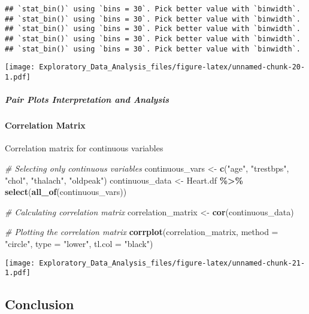 \documentclass[
]{article}
\newenvironment{Shaded}{\begin{snugshade}}{\end{snugshade}}
\newcommand{\AttributeTok}[1]{\textcolor[rgb]{0.13,0.29,0.53}{#1}}
\newcommand{\CommentTok}[1]{\textcolor[rgb]{0.56,0.35,0.01}{\textit{#1}}}
\newcommand{\FunctionTok}[1]{\textcolor[rgb]{0.13,0.29,0.53}{\textbf{#1}}}
\newcommand{\NormalTok}[1]{#1}
\newcommand{\OtherTok}[1]{\textcolor[rgb]{0.56,0.35,0.01}{#1}}
\newcommand{\SpecialCharTok}[1]{\textcolor[rgb]{0.81,0.36,0.00}{\textbf{#1}}}
\newcommand{\StringTok}[1]{\textcolor[rgb]{0.31,0.60,0.02}{#1}}
\begin{document}
\begin{verbatim}
## `stat_bin()` using `bins = 30`. Pick better value with `binwidth`.
## `stat_bin()` using `bins = 30`. Pick better value with `binwidth`.
## `stat_bin()` using `bins = 30`. Pick better value with `binwidth`.
## `stat_bin()` using `bins = 30`. Pick better value with `binwidth`.
## `stat_bin()` using `bins = 30`. Pick better value with `binwidth`.
\end{verbatim}

\texttt{[image: Exploratory\_Data\_Analysis\_files/figure-latex/unnamed-chunk-20-1.pdf]}

\subparagraph{\texorpdfstring{\textbf{Pair Plots Interpretation and
Analysis}}{Pair Plots Interpretation and Analysis}}\label{pair-plots-interpretation-and-analysis}

\paragraph{\texorpdfstring{\textbf{Correlation
Matrix}}{Correlation Matrix}}\label{correlation-matrix}

Correlation matrix for continuous variables

\begin{Shaded}
\begin{Highlighting}[]
\CommentTok{\# Selecting only continuous variables}
\NormalTok{continuous\_vars }\OtherTok{\textless{}{-}} \FunctionTok{c}\NormalTok{(}\StringTok{"age"}\NormalTok{, }\StringTok{"trestbps"}\NormalTok{, }\StringTok{"chol"}\NormalTok{, }\StringTok{"thalach"}\NormalTok{, }\StringTok{"oldpeak"}\NormalTok{)}
\NormalTok{continuous\_data }\OtherTok{\textless{}{-}}\NormalTok{ Heart.df }\SpecialCharTok{\%\textgreater{}\%} \FunctionTok{select}\NormalTok{(}\FunctionTok{all\_of}\NormalTok{(continuous\_vars))}

\CommentTok{\# Calculating correlation matrix}
\NormalTok{correlation\_matrix }\OtherTok{\textless{}{-}} \FunctionTok{cor}\NormalTok{(continuous\_data)}

\CommentTok{\# Plotting the correlation matrix}
\FunctionTok{corrplot}\NormalTok{(correlation\_matrix, }\AttributeTok{method =} \StringTok{"circle"}\NormalTok{,}
         \AttributeTok{type =} \StringTok{"lower"}\NormalTok{, }\AttributeTok{tl.col =} \StringTok{"black"}\NormalTok{)}
\end{Highlighting}
\end{Shaded}

\texttt{[image: Exploratory\_Data\_Analysis\_files/figure-latex/unnamed-chunk-21-1.pdf]}

\subsection{\texorpdfstring{\textbf{Conclusion}}{Conclusion}}\label{conclusion}
\end{document}
